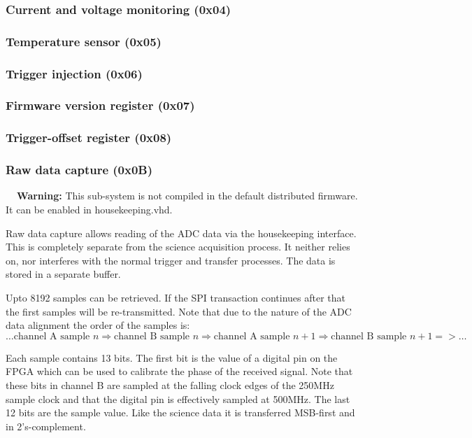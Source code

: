 \documentclass[a4paper,indent]{paper}
\newenvironment{warning}
{\par\begin{mdframed}[linewidth=2pt,linecolor=orange,backgroundcolor=orange!10]%
    \begin{list}{}{\leftmargin=0mm}\item[\bf\danger{}~~Warning: ]}
  {\end{list}\end{mdframed}\par}
\begin{document}
\subsubsection{Current and voltage monitoring (0x04)}

\subsubsection{Temperature sensor (0x05)}

\subsubsection{Trigger injection (0x06)}

\subsubsection{Firmware version register (0x07)}

\subsubsection{Trigger-offset register (0x08)}

\subsubsection{Raw data capture (0x0B)}

\begin{warning}
  This sub-system is not compiled in the default distributed firmware. It can be enabled in housekeeping.vhd.
\end{warning}

Raw data capture allows reading of the ADC data via the housekeeping interface.
This is completely separate from the science acquisition process.
It neither relies on, nor interferes with the normal trigger and transfer processes.
The data is stored in a separate buffer.

Upto 8192 samples can be retrieved. If the \ac{SPI} transaction continues after that the first samples will be re-transmitted. Note that due to the nature of the \ac{ADC} data alignment the order of the samples is:
$$
\ldots \text{channel A sample } n \Rightarrow \text{channel B sample } n \Rightarrow \text{channel A sample } n+1 \Rightarrow \text{channel B sample } n+1 => \ldots
$$

Each sample contains 13 bits. The first bit is the value of a digital pin on the \ac{FPGA} which can be used to calibrate the phase of the received signal. Note that these bits in channel B are sampled at the falling clock edges of the 250MHz sample clock and that the digital pin is effectively sampled at 500MHz. The last 12 bits are the sample value. Like the science data it is transferred MSB-first and in 2's-complement. 
\end{document}
